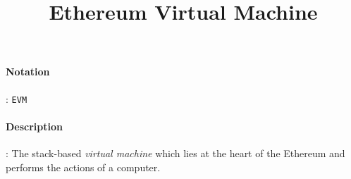 \documentclass[10pt,a4paper,oneside]{scrartcl}
\author{}
\title{Ethereum Virtual Machine}
\date{}
\begin{document}
\maketitle
\paragraph{Notation}: \texttt{EVM}
\paragraph{Description}: The stack-based \textsl{virtual machine} which lies at the heart of the Ethereum and performs the actions of a computer.  
\end{document}
